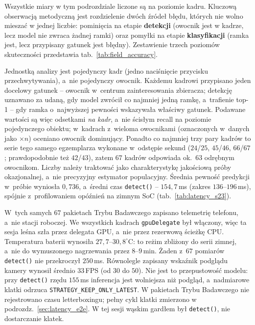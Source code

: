 Wszystkie miary w tym podrozdziale liczone są na poziomie kadru. Kluczową obserwacją metodyczną jest rozdzielenie dwóch źródeł błędu, których nie wolno mieszać w jednej liczbie: pominięcia na etapie \textbf{detekcji} (owocnik jest w kadrze, lecz model nie zwraca żadnej ramki) oraz pomyłki na etapie \textbf{klasyfikacji} (ramka jest, lecz przypisany gatunek jest błędny). Zestawienie trzech poziomów skuteczności przedstawia tab.~\ref{tab:field_accuracy}.

Jednostką analizy jest pojedynczy kadr (jedno naciśnięcie przycisku przechwytywania), a~nie pojedynczy owocnik. Każdemu kadrowi przypisano jeden docelowy gatunek -- owocnik w~centrum zainteresowania zbieracza; detekcję uznawano za udaną, gdy model zwrócił co najmniej jedną ramkę, a~trafienie top-1 -- gdy ramka o~najwyższej pewności wskazywała właściwy gatunek. Podawane wartości są więc odsetkami \emph{na kadr}, a~nie ścisłym recall na poziomie pojedynczego obiektu; w~kadrach z~wieloma owocnikami (oznaczonych w~danych jako $\times n$) oceniano owocnik dominujący. Ponadto co najmniej trzy pary kadrów to serie tego samego egzemplarza wykonane w~odstępie sekund ($24$/$25$, $45$/$46$, $66$/$67$; prawdopodobnie też $42$/$43$), zatem $67$ kadrów odpowiada ok.\ $63$ odrębnym owocnikom. Liczby należy traktować jako charakterystykę jakościową próby okazjonalnej, a~nie precyzyjny estymator populacyjny. Średnia pewność predykcji w~próbie wyniosła $0{,}736$, a~średni czas \texttt{detect()} -- $154{,}7$\,ms (zakres $136$--$196$\,ms), spójnie z~profilowaniem opóźnień na zimnym SoC (tab.~\ref{tab:latency_s23}).

W~tych samych $67$ pakietach Trybu Badawczego zapisano telemetrię telefonu, a~nie stacji roboczej. We wszystkich kadrach \texttt{gpuDelegate} był włączony, więc ta sesja leśna szła przez delegata GPU, a~nie przez rezerwową ścieżkę CPU. Temperatura baterii wynosiła $27{,}7$--$30{,}8^{\circ}\mathrm{C}$: to reżim zbliżony do serii zimnej, a~nie do wymuszonego nagrzewania przez $8$--$9$\,min. Żaden z~$67$ pomiarów \texttt{detect()} nie przekroczył $250$\,ms. Równolegle zapisany wskaźnik podglądu kamery wynosił średnio $33$\,FPS (od $30$ do $50$). Nie jest to przepustowość modelu: przy \texttt{detect()} rzędu $155$\,ms inferencja jest wolniejsza niż podgląd, a~nadmiarowe klatki odrzuca \texttt{STRATEGY\_KEEP\_ONLY\_LATEST}. W pakietach Trybu Badawczego nie rejestrowano czasu letterboxingu; pełny cykl klatki zmierzono w podrozdz.~\ref{sec:latency_e2e}. W tej sesji wąskim gardłem był \texttt{detect()}, nie dostarczanie klatek.

